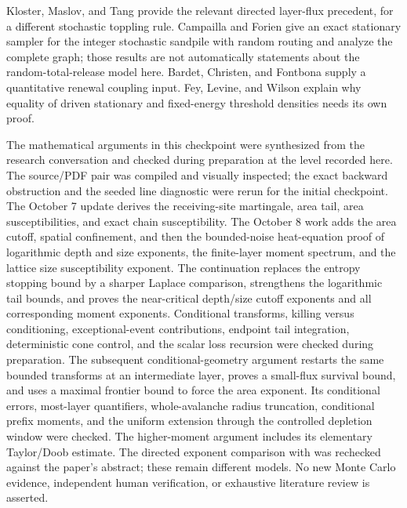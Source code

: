 \documentclass[11pt]{article}
\numberwithin{equation}{section}
\theoremstyle{definition}
\begin{document}
Kloster, Maslov, and Tang \cite{KMT} provide the relevant directed layer-flux precedent, for a different stochastic toppling rule. Campailla and Forien \cite{CF} give an exact stationary sampler for the integer stochastic sandpile with random routing and analyze the complete graph; those results are not automatically statements about the random-total-release model here. Bardet, Christen, and Fontbona \cite{BCF} supply a quantitative renewal coupling input. Fey, Levine, and Wilson \cite{FLW} explain why equality of driven stationary and fixed-energy threshold densities needs its own proof.

The mathematical arguments in this checkpoint were synthesized from the research conversation and checked during preparation at the level recorded here. The source/PDF pair was compiled and visually inspected; the exact backward obstruction and the seeded line diagnostic were rerun for the initial checkpoint. The October 7 update derives the receiving-site martingale, area tail, area susceptibilities, and exact chain susceptibility. The October 8 work adds the area cutoff, spatial confinement, and then the bounded-noise heat-equation proof of logarithmic depth and size exponents, the finite-layer moment spectrum, and the lattice size susceptibility exponent. The continuation replaces the entropy stopping bound by a sharper Laplace comparison, strengthens the logarithmic tail bounds, and proves the near-critical depth/size cutoff exponents and all corresponding moment exponents. Conditional transforms, killing versus conditioning, exceptional-event contributions, endpoint tail integration, deterministic cone control, and the scalar loss recursion were checked during preparation. The subsequent conditional-geometry argument restarts the same bounded transforms at an intermediate layer, proves a small-flux survival bound, and uses a maximal frontier bound to force the area exponent. Its conditional errors, most-layer quantifiers, whole-avalanche radius truncation, conditional prefix moments, and the uniform extension through the controlled depletion window were checked. The higher-moment argument includes its elementary Taylor/Doob estimate. The directed exponent comparison with \cite{KMT} was rechecked against the paper's abstract; these remain different models. No new Monte Carlo evidence, independent human verification, or exhaustive literature review is asserted. 
\end{document}
